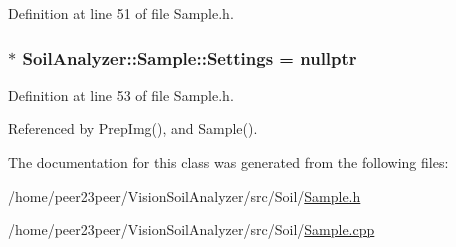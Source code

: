 Definition at line 51 of file Sample.\+h.

\hypertarget{class_soil_analyzer_1_1_sample_a31f7b29fc46497f9b2847285c7893832}{}
\subsubsection[{Settings}]{$\ast$ Soil\+Analyzer\+::\+Sample\+::\+Settings = nullptr}\label{class_soil_analyzer_1_1_sample_a31f7b29fc46497f9b2847285c7893832}


Definition at line 53 of file Sample.\+h.



Referenced by Prep\+Img(), and Sample().



The documentation for this class was generated from the following files\+:\begin{DoxyCompactItemize}
\item 
/home/peer23peer/\+Vision\+Soil\+Analyzer/src/\+Soil/\hyperlink{_sample_8h}{Sample.\+h}\item 
/home/peer23peer/\+Vision\+Soil\+Analyzer/src/\+Soil/\hyperlink{_sample_8cpp}{Sample.\+cpp}\end{DoxyCompactItemize}
